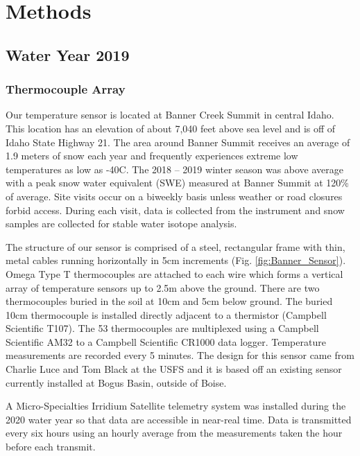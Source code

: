 \chapter{Methods}
\section{Water Year 2019} 
\subsection{Thermocouple Array}
Our temperature sensor is located at Banner Creek Summit in central Idaho. This location has an elevation of about 7,040 feet above sea level and is off of Idaho State Highway 21. The area around Banner Summit receives an average of 1.9 meters of snow each year and frequently experiences extreme low temperatures as low as -40\textdegree C. The 2018 -- 2019 winter season was above average with a peak snow water equivalent (SWE) measured at Banner Summit at 120\% of average. Site visits occur on a biweekly basis unless weather or road closures forbid access. During each visit, data is collected from the instrument and snow samples are collected for stable water isotope analysis.

The structure of our sensor is comprised of a steel, rectangular frame with thin, metal cables running horizontally in 5cm increments (Fig. \ref{fig:Banner_Sensor}). Omega Type T thermocouples are attached to each wire which forms a vertical array of temperature sensors up to 2.5m above the ground. There are two thermocouples buried in the soil at 10cm and 5cm below ground. The buried 10cm thermocouple is installed directly adjacent to a thermistor (Campbell Scientific T107). The 53 thermocouples are multiplexed using a Campbell Scientific AM32 to a Campbell Scientific CR1000 data logger. Temperature measurements are recorded every 5 minutes. The design for this sensor came from Charlie Luce and Tom Black at the USFS and it is based off an existing sensor currently installed at Bogus Basin, outside of Boise. 

A Micro-Specialties Irridium Satellite telemetry system was installed during the 2020 water year so that data are accessible in near-real time. Data is transmitted every six hours using an hourly average from the measurements taken the hour before each transmit.

